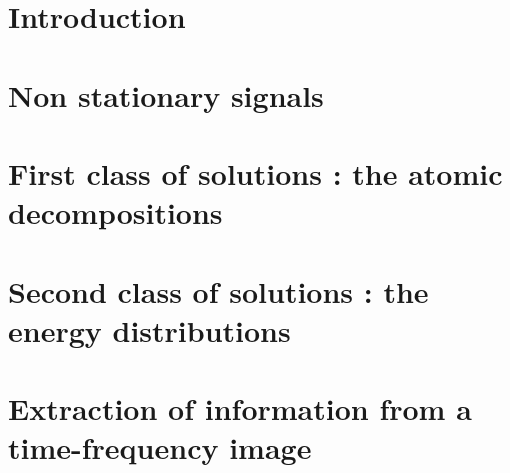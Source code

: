 \documentclass[12pt,a4paper]{book}%
\begin{document}
\cleardoublepage

\tableofcontents
\cleardoublepage
\pagestyle{myheadings}
\chapter{Introduction}


\chapter{Non stationary signals}


\chapter{First class of solutions : the atomic decompositions}


\chapter{Second class of solutions : the energy distributions}




\chapter{Extraction of information from a time-frequency image}



\clearpage
\newpage 



\newpage
{}



\newpage 

\printindex
\end{document}
